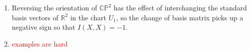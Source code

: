 \documentclass[11pt,leqno]{article}
\theoremstyle{plain}
\theoremstyle{definition}
\numberwithin{equation}{section}
\numberwithin{lem}{section}
\begin{document}
\begin{enumerate}
\begin{enumerate}
      \item Reversing the orientation of $\mathbb {CP}^2$ has the effect of interchanging the standard basis vectors of $\mathbb R^2$ in the chart $U_1$, so the change of basis matrix picks up a negative sign so that $I(X,X) = -1$.
      \item \textcolor{red}{examples are hard}
    \end{enumerate}
\end{enumerate}
\end{document}
